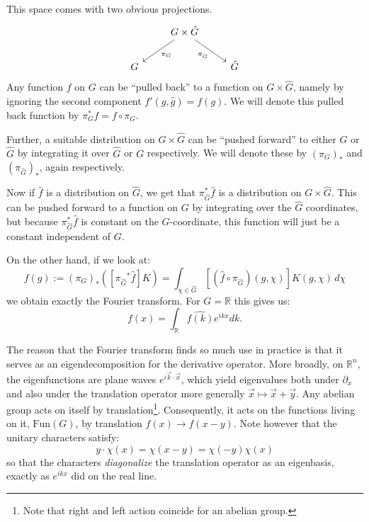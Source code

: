 This space comes with two obvious projections.
\[
\begin{tikzcd}
  & G \times \hat G \arrow[ld,"\pi_G"] \arrow[rd,swap,"\pi_{\hat G}"]&\\
G & & \hat G
\end{tikzcd}
\]
Any function $f$ on $G$ can be ``pulled back'' to a function on $G \times \hat G$, namely by ignoring the second component $f'(g, \hat g) = f(g)$. We will denote this pulled back function by $\pi_{G}^* f = f \circ \pi_G$.

Further, a suitable distribution on $G \times \hat G$ can be ``pushed forward'' to either $G$ or $\hat G$ by integrating it over $\hat G$ or $G$ respectively. We will denote these by $(\pi_G)_*$ and $(\pi_{\hat G})_*$, again respectively.

Now if $\hat f$ is a distribution on $\hat G$, we get that $\pi_{\hat G}^* \hat f$ is a distribution on $G \times \hat G$. This can be pushed forward to a function on $G$ by integrating over the $\hat G$ coordinates, but because $\pi_{\hat G}^* \hat f$ is constant on the $G$-coordinate, this function will just be a constant independent of $G$.

On the other hand, if we look at:
\begin{equation}
	f (g) := {(\pi_{G})}_* ([{\pi_{\hat G}}^* \hat f] K) = \int_{\chi \in \hat G} [(\hat f \circ \pi_{\hat G}) (g, \chi)] K(g, \chi)\, d\chi
	\label{eq:fourier}
\end{equation}
we obtain exactly the Fourier transform. For $G = \mathbb R$ this gives us:
\begin{equation}
	f(x) = \int_{\mathbb R} \widehat{f(k)} e^{ikx} dk.
\end{equation}

The reason that the Fourier transform finds so much use in practice is that it serves as an eigendecomposition for the derivative operator. More broadly, on $\mathbb R^n$, the eigenfunctions are plane waves $e^{i\vec k \cdot \vec x}$, which yield eigenvalues both under $\partial_x$ and also under the translation operator more generally $\vec x \mapsto \vec x + \vec y$. Any abelian group acts on itself by translation\footnote{Note that right and left action coincide for an abelian group.}. Consequently, it acts on the functions living on it, $\mathrm{Fun}(G)$, by translation $f(x) \to f(x - y)$. Note however that the unitary characters satisfy:
\[
	y \cdot \chi(x) = \chi(x - y) = \chi(-y) \chi(x)
\]
so that the characters \emph{diagonalize} the translation operator as an eigenbasis, exactly as $e^{ikx}$ did on the real line.

